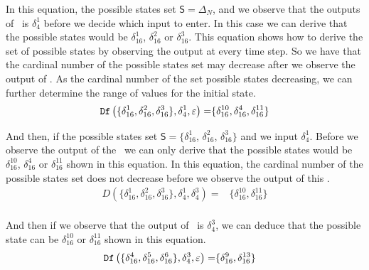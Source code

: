 \begin{example}
In this equation, the possible states set $\mathsf{S}=\Delta_N$, and  we observe that the outputs of \BCN\ is $\delta_4^1$ before we decide which input to enter. In this case we can derive that the possible states would be $\delta_{16}^1$, $\delta_{16}^2$ or  $\delta_{16}^3$. This equation shows how to derive the set of possible states by observing the output at every time step. So we have that the cardinal number of the possible states set may decrease after we observe the output of \BCN. As the cardinal number of the set possible states decreasing, we can further determine the range of values for the initial state. 
\begin{equation*}
\begin{split}
{\tt Df}\left(\{\delta_{16}^1,\delta_{16}^2,\delta_{16}^3\},\delta_4^1,\varepsilon\right)=&\{\delta_{16}^{10},\delta_{16}^4,\delta_{16}^{11}\}\\
\end{split}
\label{equ:10}
\end{equation*}

And then, if the possible states set $\mathsf{S}=\{\delta_{16}^1$, $\delta_{16}^2$, $\delta_{16}^3\}$ and we input $\delta_4^1$. Before we observe the output of the \BCN\ we can only derive that the possible states would be $\delta_{16}^{10}$, $\delta_{16}^4$ or  $\delta_{16}^{11}$ shown in this equation. In this equation, the cardinal number of the possible states set does not decrease before we observe the output of this \BCN. %
\begin{equation*}
\begin{split}
D\left(\{\delta_{16}^1,\delta_{16}^2,\delta_{16}^3\},\delta_4^1,\delta_4^3\right)=&\{\delta_{16}^{10},\delta_{16}^{11}\}\\
\end{split}
\label{equ:11}
\end{equation*}

And then if we observe that the output of \BCN\ is $\delta_4^3$, we can deduce that the possible state can be $\delta_{16}^{10}$ or  $\delta_{16}^{11}$ shown in this equation. 
\begin{equation*}
\begin{split}
{\tt Df}\left(\{\delta_{16}^4,\delta_{16}^5,\delta_{16}^6\},\delta_4^3,\varepsilon\right)=&\{\delta_{16}^9,\delta_{16}^{13}\}
\end{split}
\label{equ:12}
\end{equation*}


\end{example}
